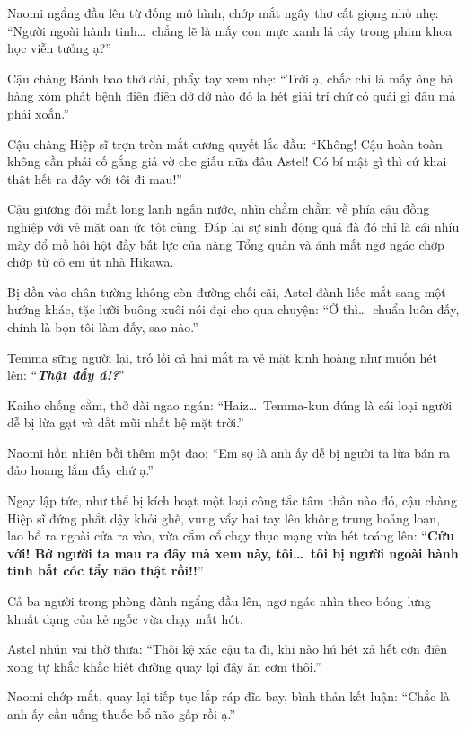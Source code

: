 \documentclass[../main.tex]{subfiles}
\begin{document}
Naomi ngẩng đầu lên từ đống mô hình, chớp mắt ngây thơ cất giọng nhỏ nhẹ: ``Người ngoài hành tinh\dots\ chẳng lẽ là mấy con mực xanh lá cây trong phim khoa học viễn tưởng ạ?''

Cậu chàng Bảnh bao thở dài, phẩy tay xem nhẹ: ``Trời ạ, chắc chỉ là mấy ông bà hàng xóm phát bệnh điên điên dở dở nào đó la hét giải trí chứ có quái gì đâu mà phải xoắn.''

Cậu chàng Hiệp sĩ trợn tròn mắt cương quyết lắc đầu: ``Không! Cậu hoàn toàn không cần phải cố gắng giả vờ che giấu nữa đâu Astel! Có bí mật gì thì cứ khai thật hết ra đây với tôi đi mau!''

Cậu giương đôi mắt long lanh ngấn nước, nhìn chằm chằm về phía cậu đồng nghiệp với vẻ mặt oan ức tột cùng. Đáp lại sự sinh động quá đà đó chỉ là cái nhíu mày đổ mồ hôi hột đầy bất lực của nàng Tổng quản và ánh mắt ngơ ngác chớp chớp từ cô em út nhà Hikawa.


Bị dồn vào chân tường không còn đường chối cãi, Astel đành liếc mắt sang một hướng khác, tặc lưỡi buông xuôi nói đại cho qua chuyện: ``Ờ thì\dots\ chuẩn luôn đấy, chính là bọn tôi làm đấy, sao nào.''

Temma sững người lại, trố lồi cả hai mắt ra vẻ mặt kinh hoàng như muốn hét lên: ``\textbf{\textit{Thật đấy á!?}}''

Kaiho chống cằm, thở dài ngao ngán: ``Haiz\dots\ Temma-kun đúng là cái loại người dễ bị lừa gạt và dắt mũi nhất hệ mặt trời.''

Naomi hồn nhiên bồi thêm một đao: ``Em sợ là anh ấy dễ bị người ta lừa bán ra đảo hoang lắm đấy chứ ạ.''

Ngay lập tức, như thể bị kích hoạt một loại công tắc tâm thần nào đó, cậu chàng Hiệp sĩ đứng phắt dậy khỏi ghế, vung vẩy hai tay lên không trung hoảng loạn, lao bổ ra ngoài cửa ra vào, vừa cắm cổ chạy thục mạng vừa hét toáng lên: ``\textbf{Cứu với! Bớ người ta mau ra đây mà xem này, tôi\dots\ tôi bị người ngoài hành tinh bắt cóc tẩy não thật rồi!!}''


Cả ba người trong phòng đành ngẩng đầu lên, ngơ ngác nhìn theo bóng lưng khuất dạng của kẻ ngốc vừa chạy mất hút.

Astel nhún vai thờ thưa: ``Thôi kệ xác cậu ta đi, khi nào hú hét xả hết cơn điên xong tự khắc khắc biết đường quay lại đây ăn cơm thôi.''

Naomi chớp mắt, quay lại tiếp tục lắp ráp đĩa bay, bình thản kết luận: ``Chắc là anh ấy cần uống thuốc bổ não gấp rồi ạ.''
\end{document}
